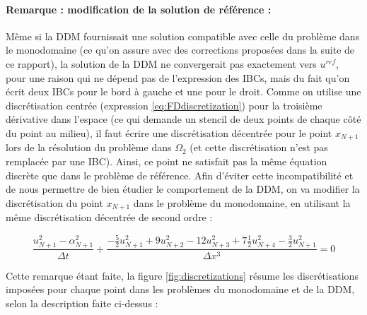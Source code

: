\paragraph{Remarque : modification de la solution de référence :}

\indent Même si la DDM fournissait une solution compatible avec celle du problème dans le monodomaine (ce qu'on assure avec des corrections proposées dans la suite de ce rapport), la solution de la DDM ne convergerait pas exactement vers $u^{ref}$, pour une raison qui ne dépend pas de l'expression des IBCs, mais du fait qu'on écrit deux IBCs pour le bord à gauche et une pour le droit. Comme on utilise une discrétisation centrée (expression \ref{eq:FDdiscretization}) pour la troisième dérivative dans l'espace (ce qui demande un stencil de deux points de chaque côté du point au milieu), il faut écrire une discrétisation décentrée pour le point $x_{N+1}$  lors de la résolution du problème dans $\Omega_2$ (et cette discrétisation n'est pas remplacée par une IBC). Ainsi, ce point ne satisfait pas la même équation discrète que dans le problème de référence. Afin d'éviter cette incompatibilité et de nous permettre de bien étudier le comportement de la DDM, on va modifier la discrétisation du point  $x_{N+1}$ dans le problème du monodomaine, en utilisant la même discrétisation décentrée de second ordre :

\begin{equation*}
    \label{eq:uncenteredFDdiscretizationN}
    \frac{u_{N+1}^2 - \alpha_{N+1}^2}{\Delta t} + \frac{-\frac{5}{2}u_{N+1}^2 + 9u_{N+2}^2 - 12 u_{N+3}^2 + 7\frac{1}{2}u_{N+4}^2 -\frac{3}{2}u_{N+1}^2}{\Delta x ^3} = 0
\end{equation*}

\indent Cette remarque étant faite, la figure \ref{fig:discretizations} résume les discrétisations imposées pour chaque point dans les problèmes du monodomaine et de la DDM, selon la description faite ci-dessus :

\indent


